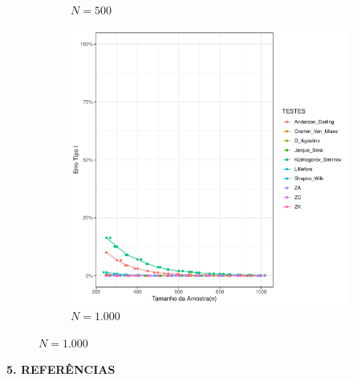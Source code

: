 \documentclass[final]{beamer}
\begin{document}
\begin{frame}[t]
\begin{columns}[t,totalwidth=0.6\paperwidth]
\begin{column}{0.45\textwidth}
\begin{figure}[H]
\begin{subfigure}[b]{0.3\textwidth}
        \caption{\(N = 500\)}
        \label{fig:beta_50}
    \end{subfigure}
    \hfill
    \begin{subfigure}[b]{0.3\textwidth}
        \centering
        \includegraphics[width=\textwidth]{Distribuição_Beta/Erro_TipoI/erro_tipo_I_beta_1000.pdf}
        \caption{\(N = 1.000\)}
        \label{fig:beta_100}
    \end{subfigure}
    \label{fig:erro_tipoI_beta}
\end{figure}




    \vspace{1.3cm}
{\large\bfseries 5. REFERÊNCIAS}\par

    \vspace{1.3cm}

    
  
    \normalsize
  \end{column}
\end{columns}

\end{frame}
\end{document}
